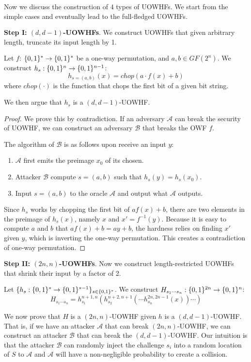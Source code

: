 Now we discuss the construction of $4$ types of UOWHFs. We start from the simple cases and eventually lead to the full-fledged UOWHFs.

\noindent\textbf{Step I: $(d, d-1)$-UOWHFs}.
We construct UOWHFs that given arbitrary length, truncate its input length by 1. 
\begin{construction}
    Let $f$: $\{0,1\}^{*}\rightarrow\{0,1\}^{*}$ be a one-way permutation, and $a,b\in GF(2^n)$. We construct $h_s: \{0,1\}^{n}\rightarrow\{0,1\}^{n-1}$: 
    \[
        h_{s=(a,b)}(x)=chop(a\cdot f(x)+b)
    \]
    where $chop(\cdot)$ is the function that chops the first bit of a given bit string. 
\end{construction}
We then argue that $h_s$ is a $(d,d-1)$-UOWHF. 

\begin{proof}
    We prove this by contradiction. If an adversary $\mathcal{A}$ can break the security of UOWHF, we can construct an adversary $\mathcal{B}$ that breaks the OWF $f$. 

    The algorithm of $\mathcal{B}$ is as follows upon receive an input $y$:
    \begin{enumerate}
        \item $\mathcal{A}$ first emits the preimage $x_0$ of its chosen.
        \item Attacker $\mathcal{B}$ compute $s=(a,b)$ such that $h_s(y)=h_s(x_0)$.
        \item Input $s=(a,b)$ to the oracle $\mathcal{A}$ and output what $\mathcal{A}$ outputs. 
    \end{enumerate}
    
    Since $h_s$ works by chopping the first bit of $af(x)+b$, there are two elements in the preimage of $h_s(x)$, namely $x$ and $x'=f^{-1}(y)$. 
    Because it is easy to compute $a$ and $b$ that $af(x)+b=ay+b$, the hardness relies on finding $x'$ given $y$, which is inverting the one-way permutation. 
    This creates a contradiction of one-way permutation. 
\end{proof}

\noindent\textbf{Step II: $(2n, n)$-UOWHFs}.
Now we construct length-restricted UOWHFs that shrink their input by a factor of 2.

\begin{construction}
    Let $\{h_s: \{0,1\}^{*}\rightarrow\{0,1\}^{*-1}\}_{s\in\{0,1\}^{*}}$. We construct $H_{s_1\cdots s_n}:\{0,1\}^{2n}\rightarrow\{0,1\}^{n}$:
    \[
        H_{s_1\cdots s_n}=h_{s_1}^{n+1,n}(h_{s_2}^{n+2,n+1}(\cdots h_{s_n}^{2n,2n-1}(x))\cdots)
    \]
\end{construction}
We now prove that $H$ is a $(2n, n)$-UOWHF given $h$ is a $(d,d-1)$-UOWHF.
That is, if we have an attacker $\mathcal{A}$ that can break $(2n, n)$-UOWHF, we can construct an attacker $\mathcal{B}$ that can break the $(d,d-1)$-UOWHF. 
Our intuition is that the attacker $\mathcal{B}$ can randomly inject the challenge $s_i$ into a random location of $S$ to $\mathcal{A}$ and $\mathcal{A}$ will have a non-negligible probability to create a collision. 

